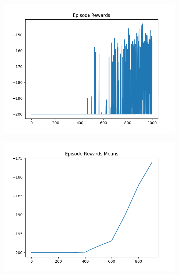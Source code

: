 \begin{figure}[H]
\begin{subfigure}{.47\linewidth}
        \includegraphics[width=\textwidth]{mountain/2024-06-15_11-21-25_dqn_mountaincar_episode_rewards.png}
    \end{subfigure}
    \begin{subfigure}{.47\linewidth}
        \centering
        \includegraphics[width=\textwidth]{mountain/2024-06-15_11-21-25_dqn_mountaincar_episode_rewards_means.png}
    \end{subfigure}
\end{figure}
